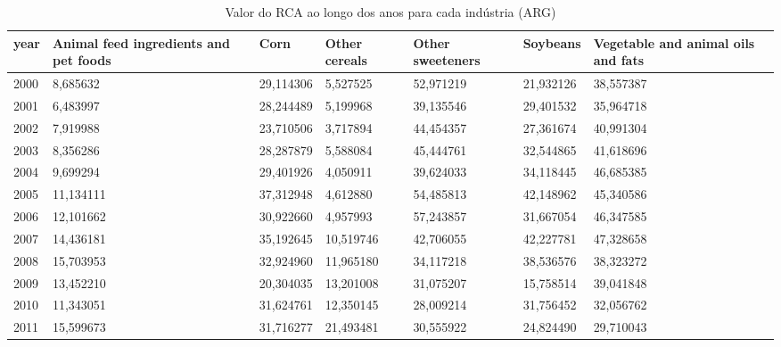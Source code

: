 \begin{table}
\centering
\caption{Valor do RCA ao longo dos anos para cada indústria (ARG)}
\begin{tabular}{p{1cm}p{2cm}p{2cm}p{2cm}p{2cm}p{2cm}p{2cm}}
\toprule
 year &  Animal feed ingredients and pet foods &      Corn &  Other cereals &  Other sweeteners &  Soybeans &  Vegetable and animal oils and fats \\
\midrule
 2000 &                               8,685632 & 29,114306 &       5,527525 &         52,971219 & 21,932126 &                           38,557387 \\
 2001 &                               6,483997 & 28,244489 &       5,199968 &         39,135546 & 29,401532 &                           35,964718 \\
 2002 &                               7,919988 & 23,710506 &       3,717894 &         44,454357 & 27,361674 &                           40,991304 \\
 2003 &                               8,356286 & 28,287879 &       5,588084 &         45,444761 & 32,544865 &                           41,618696 \\
 2004 &                               9,699294 & 29,401926 &       4,050911 &         39,624033 & 34,118445 &                           46,685385 \\
 2005 &                              11,134111 & 37,312948 &       4,612880 &         54,485813 & 42,148962 &                           45,340586 \\
 2006 &                              12,101662 & 30,922660 &       4,957993 &         57,243857 & 31,667054 &                           46,347585 \\
 2007 &                              14,436181 & 35,192645 &      10,519746 &         42,706055 & 42,227781 &                           47,328658 \\
 2008 &                              15,703953 & 32,924960 &      11,965180 &         34,117218 & 38,536576 &                           38,323272 \\
 2009 &                              13,452210 & 20,304035 &      13,201008 &         31,075207 & 15,758514 &                           39,041848 \\
 2010 &                              11,343051 & 31,624761 &      12,350145 &         28,009214 & 31,756452 &                           32,056762 \\
 2011 &                              15,599673 & 31,716277 &      21,493481 &         30,555922 & 24,824490 &                           29,710043 \\

\end{tabular}
\end{table}
